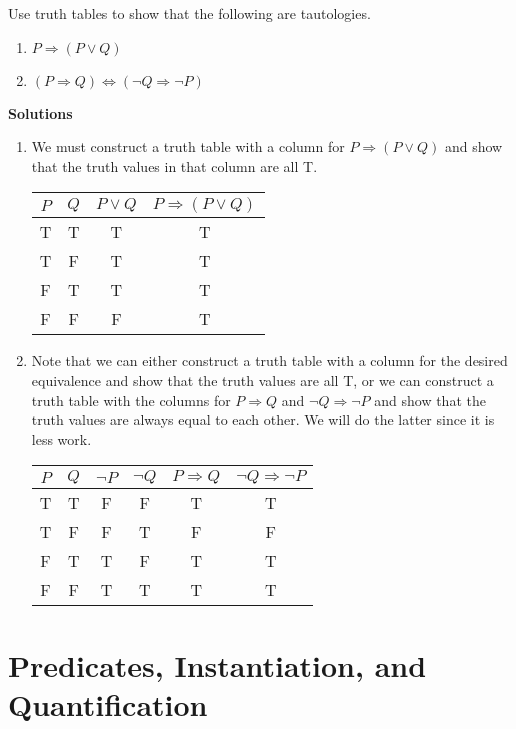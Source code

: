 \begin{example}
Use truth tables to show that the following are tautologies.
\begin{enumerate}\itemsep0pt
\item $P\Rightarrow(P\lor Q)$
\item $(P\Rightarrow Q)\Leftrightarrow(\neg Q\Rightarrow \neg P)$
\end{enumerate}
{\bfseries\upshape Solutions}
\begin{enumerate}\itemsep0pt
\item We must construct a truth table with a column for $P\Rightarrow(P\lor Q)$ and show that the truth values in that column are all T.
\begin{center}
\begin{tabular}[t]{|c|c|c|c|}
\hline
$P$ & $Q$ & $P\lor Q$ & $P\Rightarrow(P\lor Q)$ \\
\hline
\hline
T & T & T & T \\
\hline
T & F & T & T \\
\hline
F & T & T & T \\
\hline
F & F & F & T \\
\hline
\end{tabular}
\end{center}
\item Note that we can either construct a truth table with a column for the desired equivalence and show that the truth values are all T, or we can construct a truth table with the columns for $P\Rightarrow Q$ and $\neg Q\Rightarrow \neg P$ and show that the truth values are always equal to each other. We will do the latter since it is less work.
\begin{center}
\begin{tabular}[t]{|c|c|c|c|c|c|}
\hline
$P$ & $Q$ & $\neg P$ & $\neg Q$ & $P\Rightarrow Q$ & $\neg Q\Rightarrow \neg P$ \\  
\hline
\hline
T & T & F & F & T & T \\ 
\hline
T & F & F & T & F & F \\
\hline
F & T & T & F & T & T \\
\hline
F & F & T & T & T & T \\
\hline
\end{tabular}
\end{center}
\end{enumerate}
\end{example}

\section{Predicates, Instantiation, and Quantification}\label{PredQuant}

